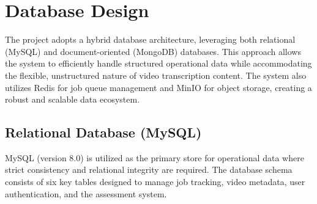 \section{Database Design}

The project adopts a hybrid database architecture, leveraging both relational (MySQL) and document-oriented (MongoDB) databases. This approach allows the system to efficiently handle structured operational data while accommodating the flexible, unstructured nature of video transcription content. The system also utilizes Redis for job queue management and MinIO for object storage, creating a robust and scalable data ecosystem.

\subsection{Relational Database (MySQL)}

MySQL (version 8.0) is utilized as the primary store for operational data where strict consistency and relational integrity are required. The database schema consists of six key tables designed to manage job tracking, video metadata, user authentication, and the assessment system.

